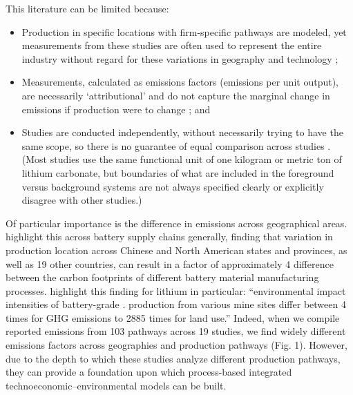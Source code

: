 \documentclass{article}
\renewcommand\_{\textunderscore\allowbreak}
\begin{document}
This literature can be limited because:
\begin{itemize}
    \item Production in specific locations with firm-specific pathways are modeled, yet measurements from these studies are often used to represent the entire industry without regard for these variations in geography and technology \cite{sunRobustAssessmentsLithium2025, kallitsisThinkGlobalAct2024};
    
    \item Measurements, calculated as emissions factors (emissions per unit output), are necessarily `attributional' and do not capture the marginal change in emissions if production were to change \cite{nationalacademiesofscienceengineeringandmedicineAssessmentTechnologiesImproving2021}; and

    \item Studies are conducted independently, without necessarily trying to have the same scope, so there is no guarantee of equal comparison across studies \cite{bergersonLifeCycleAssessment2020}. (Most studies use the same functional unit of one kilogram or metric ton of lithium carbonate, but boundaries of what are included in the foreground versus background systems are not always specified clearly or explicitly disagree with other studies.)
\end{itemize}

Of particular importance is the difference in emissions across geographical areas. \citet{kallitsisThinkGlobalAct2024} highlight this across battery supply chains generally, finding that variation in production location across Chinese and North American states and provinces, as well as 19 other countries, can result in a factor of approximately 4 difference between the carbon footprints of different battery material manufacturing processes. \citet{sunRobustAssessmentsLithium2025} highlight this finding for lithium in particular: ``environmental impact intensities of battery-grade . production from various mine sites differ between 4 times for GHG emissions to 2885 times for land use.'' Indeed, when we compile reported emissions from 103 pathways across 19 studies, we find widely different emissions factors across geographies and production pathways (Fig. 1). However, due to the depth to which these studies analyze different production pathways, they can provide a foundation upon which process-based integrated technoeconomic--environmental models can be built.
\end{document}
